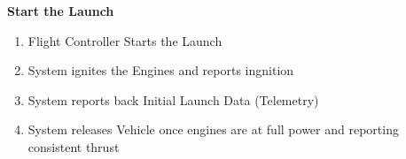 \documentclass[letterpaper]{article}
\begin{document}
\noindent
\textbf{Start the Launch}
\begin{enumerate}
\item Flight Controller Starts the Launch
\item System ignites the Engines and reports ingnition
\item System reports back Initial Launch Data (Telemetry)
\item System releases Vehicle once engines are at full power and
reporting consistent thrust
\end{enumerate}
\end{document}
